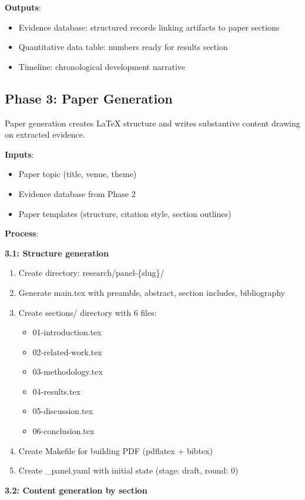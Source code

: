 \textbf{Outputs}:
\begin{itemize}
\item Evidence database: structured records linking artifacts to paper sections
\item Quantitative data table: numbers ready for results section
\item Timeline: chronological development narrative
\end{itemize}

\subsection{Phase 3: Paper Generation}

Paper generation creates LaTeX structure and writes substantive content drawing on extracted evidence.

\textbf{Inputs}:
\begin{itemize}
\item Paper topic (title, venue, theme)
\item Evidence database from Phase 2
\item Paper templates (structure, citation style, section outlines)
\end{itemize}

\textbf{Process}:

\textbf{3.1: Structure generation}
\begin{enumerate}
\item Create directory: research/panel-\{slug\}/
\item Generate main.tex with preamble, abstract, section includes, bibliography
\item Create sections/ directory with 6 files:
  \begin{itemize}
  \item 01-introduction.tex
  \item 02-related-work.tex
  \item 03-methodology.tex
  \item 04-results.tex
  \item 05-discussion.tex
  \item 06-conclusion.tex
  \end{itemize}
\item Create Makefile for building PDF (pdflatex + bibtex)
\item Create \_panel.yaml with initial state (stage: draft, round: 0)
\end{enumerate}

\textbf{3.2: Content generation by section}

